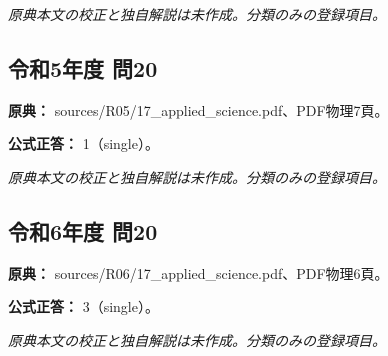\par\textit{原典本文の校正と独自解説は未作成。分類のみの登録項目。}

\subsection{令和5年度 問20}
\label{q:r05-reg-applied-20}

\noindent\textbf{原典：} sources/R05/17\_applied\_science.pdf、PDF物理7頁。

\textbf{公式正答：} 1（single）。

\par\textit{原典本文の校正と独自解説は未作成。分類のみの登録項目。}

\subsection{令和6年度 問20}
\label{q:r06-reg-applied-20}

\noindent\textbf{原典：} sources/R06/17\_applied\_science.pdf、PDF物理6頁。

\textbf{公式正答：} 3（single）。

\par\textit{原典本文の校正と独自解説は未作成。分類のみの登録項目。}
